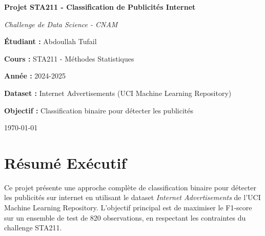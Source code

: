 \documentclass[12pt,a4paper]{article}
\begin{document}
\begin{titlepage}
    \centering
    \vspace*{2cm}
    
    {\Huge\bfseries Projet STA211 - Classification de Publicités Internet\par}
    
    \vspace{1cm}
    
    {\Large\textit{Challenge de Data Science - CNAM}\par}
    
    \vspace{2cm}
    
    {\large\textbf{Étudiant :} Abdoullah Tufail\par}
    
    \vspace{0.5cm}
    
    {\large\textbf{Cours :} STA211 - Méthodes Statistiques\par}
    
    \vspace{0.5cm}
    
    {\large\textbf{Année :} 2024-2025\par}
    
    \vspace{2cm}
    
    {\large\textbf{Dataset :} Internet Advertisements (UCI Machine Learning Repository)\par}
    
    \vspace{1cm}
    
    {\large\textbf{Objectif :} Classification binaire pour détecter les publicités\par}
    
    \vfill
    
    {\large \today\par}
\end{titlepage}

\tableofcontents
\newpage

\section{Résumé Exécutif}

Ce projet présente une approche complète de classification binaire pour détecter les publicités sur internet en utilisant le dataset \textit{Internet Advertisements} de l'UCI Machine Learning Repository. L'objectif principal est de maximiser le F1-score sur un ensemble de test de 820 observations, en respectant les contraintes du challenge STA211.
\end{document}
